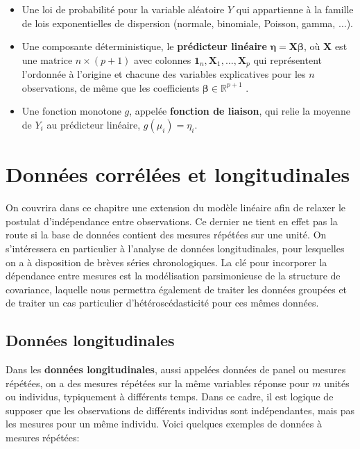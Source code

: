\documentclass[
  11pt,
  letterpaper,
]{article}
\providecommand{\tightlist}{%
  \setlength{\itemsep}{0pt}\setlength{\parskip}{0pt}}
\theoremstyle{definition}
\theoremstyle{definition}
\theoremstyle{definition}
\theoremstyle{definition}
\theoremstyle{remark}
\begin{document}
\begin{itemize}
\tightlist
\item
  Une loi de probabilité pour la variable aléatoire \(Y\) qui appartienne à la famille de lois exponentielles de dispersion (normale, binomiale, Poisson, gamma, \(\ldots\)).
\item
  Une composante déterministique, le \textbf{prédicteur linéaire} \(\boldsymbol{\eta}=\mathbf{X} \boldsymbol{\beta}\), où \(\mathbf{X}\) est une matrice \(n\times (p+1)\) avec colonnes \(\mathbf{1}_n, \mathbf{X}_1, \ldots, \mathbf{X}_p\) qui représentent l'ordonnée à l'origine et chacune des variables explicatives pour les \(n\) observations, de même que les coefficients \(\boldsymbol{\beta} \in \mathbb{R}^{p+1}\) .
\item
  Une fonction monotone \(g\), appelée \textbf{fonction de liaison}, qui relie la moyenne de \(Y_i\) au prédicteur linéaire, \(g(\mu_i)=\eta_i\).
\end{itemize}

\hypertarget{donnees-correlees-longitudinales}{%
\section{Données corrélées et longitudinales}\label{donnees-correlees-longitudinales}}

On couvrira dans ce chapitre une extension du modèle linéaire afin de relaxer le postulat d'indépendance entre observations. Ce dernier ne tient en effet pas la route si la base de données contient des mesures répétées sur une unité. On s'intéressera en particulier à l'analyse de données longitudinales, pour lesquelles on a à disposition de brèves séries chronologiques. La clé pour incorporer la dépendance entre mesures est la modélisation parsimonieuse de la structure de covariance, laquelle nous permettra également de traiter les données groupées et de traiter un cas particulier d'hétéroscédasticité pour ces mêmes données.

\hypertarget{donnuxe9es-longitudinales}{%
\subsection{Données longitudinales}\label{donnuxe9es-longitudinales}}

Dans les \textbf{données longitudinales}, aussi appelées données de panel ou mesures répétées, on a des mesures répétées sur la même variables réponse pour \(m\) unités ou individus, typiquement à différents temps. Dans ce cadre, il est logique de supposer que les observations de différents individus sont indépendantes, mais pas les mesures pour un même individu. Voici quelques exemples de données à mesures répétées:
\end{document}
